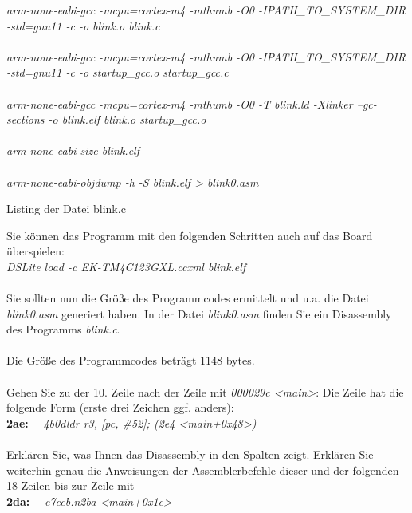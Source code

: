 \textit{arm-none-eabi-gcc -mcpu=cortex-m4 -mthumb -O0 -I{PATH\_TO\_SYSTEM\_DIR} -std=gnu11 -c -o blink.o blink.c}\\ \\
\textit{arm-none-eabi-gcc -mcpu=cortex-m4 -mthumb -O0 -I{PATH\_TO\_SYSTEM\_DIR} -std=gnu11 -c -o startup\_gcc.o startup\_gcc.c}\\ \\
\textit{arm-none-eabi-gcc -mcpu=cortex-m4 -mthumb -O0 -T blink.ld -Xlinker --gc-sections -o blink.elf blink.o startup\_gcc.o}\\ \\
\textit{arm-none-eabi-size blink.elf}\\ \\
\textit{arm-none-eabi-objdump -h -S blink.elf > blink0.asm}

\begin{center}
	Listing der Datei blink.c
\end{center}
\newpage
\noindent Sie können das Programm mit den folgenden Schritten auch auf das Board überspielen:\\
\textit{DSLite load -c EK-TM4C123GXL.ccxml blink.elf}\\ \\
Sie sollten nun die Grö\ss{}e des Programmcodes ermittelt und u.a. die Datei \textit{blink0.asm} generiert haben. In der Datei \textit{blink0.asm} finden Sie ein Disassembly des Programms \textit{blink.c}.\\ \\
Die Grö\ss{}e des Programmcodes beträgt 1148 bytes.\\ \\
Gehen Sie zu der 10. Zeile nach der Zeile mit \textit{000029c <main>}: Die Zeile hat die folgende Form (erste drei Zeichen ggf. anders):\\
\textbf{2ae:}~~ \textit{4b0d\quad \quad \quad ldr \quad r3, [pc, \#52]\quad \quad ; (2e4 <main+0x48>)}\\ \\
Erklären Sie, was Ihnen das Disassembly in den Spalten zeigt. Erklären Sie weiterhin genau die Anweisungen der Assemblerbefehle dieser und der folgenden 18 Zeilen bis zur Zeile mit\\
\textbf{2da:}~~ \textit{e7ee\quad \quad \quad b.n\quad 2ba <main+0x1e>\quad \quad }\\ \\
